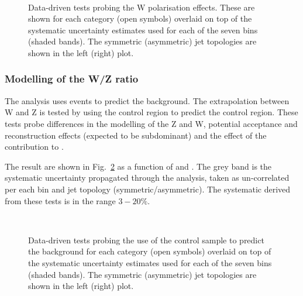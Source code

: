 \begin{figure}[h!]
  \begin{center}
    ~~
    \caption{Data-driven tests probing the W polarisation effects. 
      These are shown for each
      \njet category (open symbols) overlaid on top of the systematic
      uncertainty estimates used for each of the seven \scalht bins
      (shaded bands). 
      The symmetric (asymmetric) jet topologies are shown in the left (right) plot.       
    }
    \label{fig:closureMuPToMuM}
  \end{center} 
\end{figure}

\subsubsection{Modelling of the W/Z ratio}

The \alphat analysis uses \mj events to predict the \znunu background. The extrapolation 
between W and Z is tested by using the \mj control region to predict the \mmj control region.
These tests probe differences in the modelling of the Z and W, potential acceptance and
reconstruction effects (expected to be subdominant) and the effect of 
the \ttbar contribution to \mj.

The result are shown in Fig.~\ref{fig:closureMuToMuMu} as a function of \scalht and \njet. 
The grey band is the systematic uncertainty propagated through the analysis, 
taken as un-correlated per each \scalht bin and jet topology (symmetric/asymmetric). The systematic derived from these tests is
in the range $3-20\%$.



\begin{figure}[h!]
  \begin{center}
    ~~
    \caption{Data-driven tests probing the use of the \mj control sample
      to predict the \znunu background for each
      \njet category (open symbols) overlaid on top of the systematic
      uncertainty estimates used for each of the seven \scalht bins (shaded bands).  
      The symmetric (asymmetric) jet topologies are shown in the left (right) plot. 
    }
    \label{fig:closureMuToMuMu}
  \end{center} 
\end{figure}
